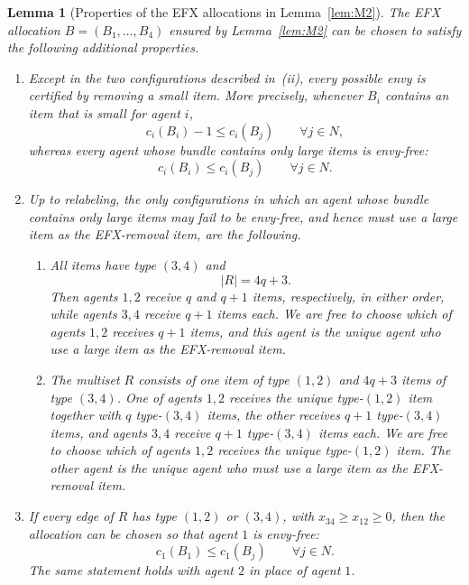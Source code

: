 \documentclass{article}
\newtheorem{lemma}{Lemma}
\theoremstyle{definition}
\begin{document}
\begin{lemma}[Properties of the EFX allocations in Lemma~\ref{lem:M2}]\label{lem:M2properties}
The EFX allocation $B=(B_1,\ldots,B_4)$ ensured by Lemma~\ref{lem:M2} can be chosen to satisfy the
following additional properties.
\begin{enumerate}[label=(\roman*)]
\item Except in the two configurations described in~(ii), every possible envy is certified by removing a small item.  More precisely,
whenever $B_i$ contains an item that is small for agent $i$,
\[
 c_i(B_i)-1\le c_i(B_j)\qquad\forall j\in N,
\]
whereas every agent whose bundle contains only large items is envy-free:
\[
 c_i(B_i)\le c_i(B_j)\qquad\forall j\in N.
\]

\item Up to relabeling, the only configurations in which an agent whose
bundle contains only large items may fail to be envy-free, and hence
must use a large item as the EFX-removal item, are the following.
\begin{enumerate}[label=(\alph*)]
\item All items have type $(3,4)$ and
\[
 |R|=4q+3.
\]
Then agents $1,2$ receive $q$ and $q+1$ items, respectively, in either
order, while agents $3,4$ receive $q+1$ items each.  We are free to choose
which of agents $1,2$ receives $q+1$ items, and this agent is the unique agent who use a large item as the EFX-removal item.

\item The multiset $R$ consists of one item of type $(1,2)$ and
$4q+3$ items of type $(3,4)$.  One of agents $1,2$ receives the unique
type-$(1,2)$ item together with $q$ type-$(3,4)$ items, the other receives
$q+1$ type-$(3,4)$ items, and agents $3,4$ receive $q+1$ type-$(3,4)$
items each.  We are free to choose which of agents $1,2$ receives the unique
type-$(1,2)$ item.  The other agent is the unique agent who must use a large
item as the EFX-removal item.
\end{enumerate}

\item If every edge of $R$ has type $(1,2)$ or $(3,4)$, with
$x_{34}\ge x_{12}\ge 0$, then the allocation can be chosen so that agent $1$
is envy-free:
\[
 c_1(B_1)\le c_1(B_j)\qquad\forall j\in N.
\]
The same statement holds with agent $2$ in place of agent $1$.
\end{enumerate}
\end{lemma}
\end{document}
